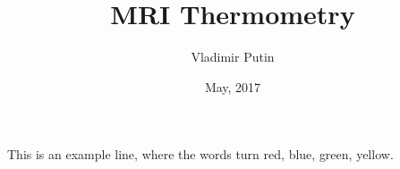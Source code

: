 \documentclass[a4paper,12pt]{article}
\title{MRI Thermometry}
\author{Vladimir Putin}
\date{May, 2017}
\begin{document}
\maketitle

This is an example line, where the words turn {\color{red}red}, {\color{blue}blue}, {\color{green} green}, {\color{yellow} yellow}. \cite{}

\lipsum[2-4]



\end{document}
